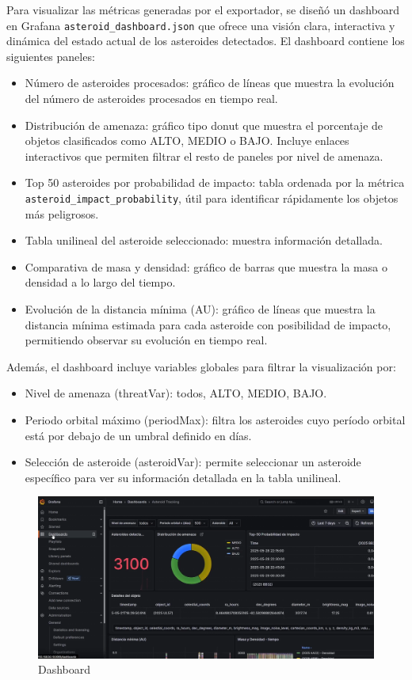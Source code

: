 \documentclass[12pt]{article}
\begin{document}
Para visualizar las métricas generadas por el exportador, se diseñó un dashboard en Grafana \texttt{asteroid\_dashboard.json} 
que ofrece una visión clara, interactiva y dinámica del estado actual de los asteroides detectados.
El dashboard contiene los siguientes paneles:
\begin{itemize}
  \item Número de asteroides procesados: gráfico de líneas que muestra la evolución del número de asteroides procesados en tiempo real.
  \item Distribución de amenaza: gráfico tipo donut que muestra el porcentaje de objetos clasificados como 
  ALTO, MEDIO o BAJO. Incluye enlaces interactivos que permiten filtrar el resto de paneles por nivel de amenaza.
  \item Top 50 asteroides por probabilidad de impacto: tabla ordenada por la métrica
  \\ 
  \texttt{asteroid\_impact\_probability}, 
  útil para identificar rápidamente los objetos más peligrosos.
  \item Tabla unilineal del asteroide seleccionado: muestra información detallada.
  \item Comparativa de masa y densidad: gráfico de barras que muestra la masa o densidad a lo largo del tiempo.
  \item Evolución de la distancia mínima (AU): gráfico de líneas que muestra la distancia mínima estimada para cada asteroide con 
  posibilidad de impacto, permitiendo observar su evolución en tiempo real.
\end{itemize}

Además, el dashboard incluye variables globales para filtrar la visualización por:
\begin{itemize}
  \item Nivel de amenaza (threatVar): todos, ALTO, MEDIO, BAJO.
  \item Periodo orbital máximo (periodMax): filtra los asteroides cuyo período orbital está por debajo de un umbral definido en días.
  \item Selección de asteroide (asteroidVar): permite seleccionar un asteroide específico para ver su información detallada en la tabla unilineal.
\end{itemize}

\begin{figure}[h!]
    \centering
    \includegraphics[width=.7\textwidth]{assets/proyecto/dashboard.PNG}
    \caption{Dashboard}
    \label{fig:my_label}
\end{figure}
\end{document}
